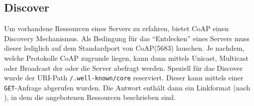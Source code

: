 \subsection{Discover}
\label{Discover}
Um vorhandene Ressourcen eines Servers zu erfahren, bietet \ac{CoAP} einen
Discovery Mechanismus.
Als Bedingung für das "`Entdecken"' eines Servers muss dieser lediglich auf dem
Standardport von \ac{CoAP}(5683) lauschen. Je nachdem, welche Protokolle \ac{CoAP}
zugrunde liegen, kann dann mittels Unicast, Multicast oder Broadcast der oder
die Server abefragt werden. Speziell für das Discover wurde der \ac{URI}-Path
\verb!/.well-known/core! reserviert. Dieser kann mittels einer \verb!GET!-Anfrage
abgerufen wurden. Die Antwort enthält dann ein
Linkformat (nach \cite{rfc6690}), in dem die angebotenen Ressourcen beschrieben
sind.
